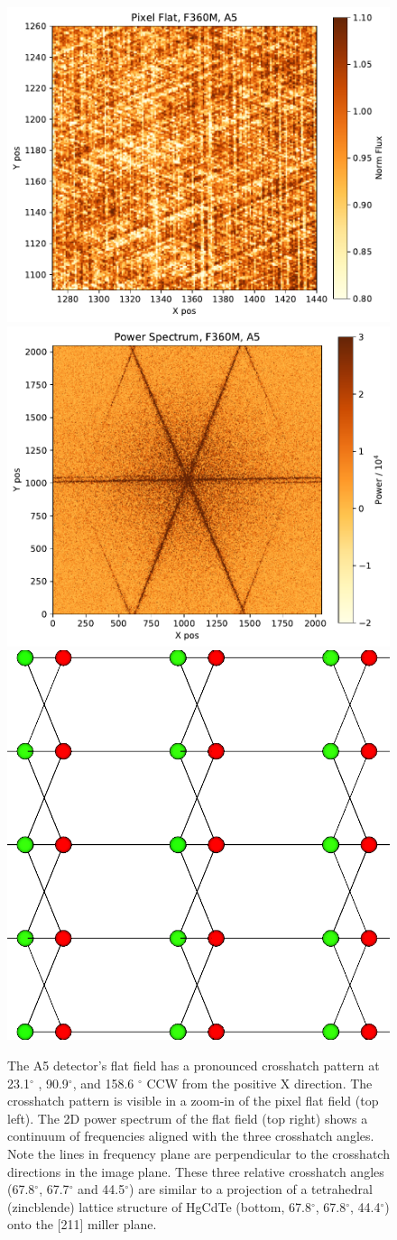 \documentclass{aastex62}
\newcommand{\degree}{^\circ}
\begin{document}
\begin{figure}[!hbtp]
\centering
\includegraphics[width=.49\columnwidth]{crosshatch_zoom.pdf}
\includegraphics[width=.49\columnwidth]{crosshatch_2d_power.pdf}
\includegraphics[width=.3\columnwidth]{tetrahedral_lattice_projection.png}
\caption{
The A5 detector's flat field has a pronounced crosshatch pattern at 23.1$\degree$ , 90.9$\degree$, and 158.6 $\degree$ CCW from the positive X direction.
The crosshatch pattern is visible in a zoom-in of the pixel flat field (top left).
The 2D power spectrum of the flat field (top right) shows a continuum of frequencies aligned with the three crosshatch angles.
Note the lines in frequency plane are perpendicular to the crosshatch directions in the image plane.
These three relative crosshatch angles (67.8$\degree$, 67.7$\degree$ and 44.5$\degree$) are similar to a projection of a tetrahedral (zincblende) lattice structure of HgCdTe (bottom, 67.8$\degree$, 67.8$\degree$, 44.4$\degree$) onto the [211] miller plane.
}\label{fig:crossHatchA5}
\end{figure}
\end{document}
